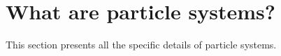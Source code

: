 \section{What are particle systems?}
This section presents all the specific details of particle systems.
